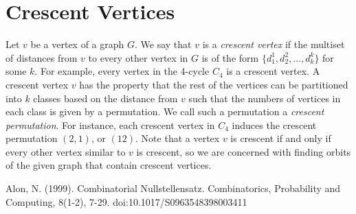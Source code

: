 \documentclass[12]{article}
\theoremstyle{definition}
\begin{document}
	\section{Crescent Vertices}
	
	Let $v$ be a vertex of a graph $G$.  We say that $v$ is a \emph{crescent vertex} if the multiset of distances from $v$ to every other vertex in $G$ is of the form $\{d_1^{1},d_2^2,\ldots,d_k^{k}\}$ for some $k$.  For example, every vertex in the $4$-cycle $C_4$ is a crescent vertex.  A crescent vertex $v$ has the property that the rest of the vertices can be partitioned into $k$ classes based on the distance from $v$ such that the numbers of vertices in each class is given by a permutation.  We call such a permutation a \emph{crescent permutation}.  For instance, each crescent vertex in $C_4$ induces the crescent permutation $(2,1)$, or $(12)$.  Note that a vertex $v$ is crescent if and only if every other vertex similar to $v$ is crescent, so we are concerned with finding orbits of the given graph that contain crescent vertices.
	
	\newpage
	\begin{thebibliography}{100}
		 Alon, N. (1999). Combinatorial Nullstellensatz. Combinatorics, Probability and Computing, 8(1-2), 7-29. doi:10.1017/S0963548398003411
	\end{thebibliography}
	
\end{document}
